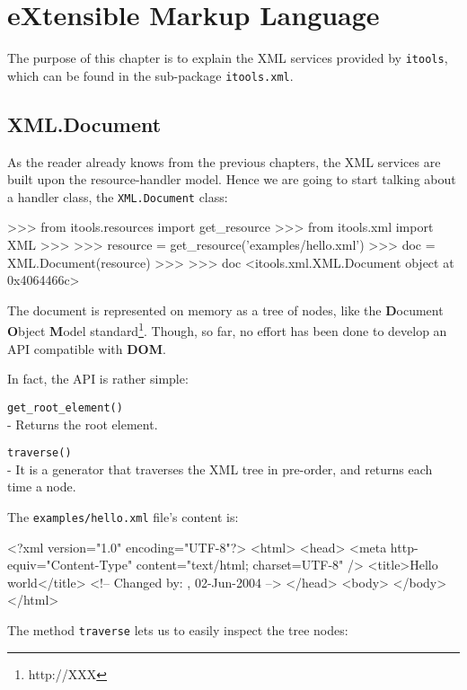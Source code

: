 \chapter{eXtensible Markup Language}

The purpose of this chapter is to explain the XML services provided by
{\tt itools}, which can be found in the sub-package {\tt itools.xml}.

\section{XML.Document}

As the reader already knows from the previous chapters, the XML services
are built upon the resource-handler model. Hence we are going to start
talking about a handler class, the {\tt XML.Document} class:

\begin{code}
    >>> from itools.resources import get_resource
    >>> from itools.xml import XML
    >>>
    >>> resource = get_resource('examples/hello.xml')
    >>> doc = XML.Document(resource)
    >>>
    >>> doc
    <itools.xml.XML.Document object at 0x4064466c>
\end{code}

The document is represented on memory as a tree of nodes, like the
{\bf D}ocument {\bf O}bject {\bf M}odel standard\footnote{http://XXX}.
Though, so far, no effort has been done to develop an API compatible with
{\bf DOM}.

In fact, the API is rather simple:

\begin{api}
    {\tt get\_root\_element()}\\
    - Returns the root element.

    {\tt traverse()}\\
    - It is a generator that traverses the XML tree in pre-order, and returns
    each time a node.
\end{api}

The {\tt examples/hello.xml} file's content is:

\begin{code}
    <?xml version="1.0" encoding="UTF-8"?>
    <html>
      <head>
        <meta http-equiv="Content-Type" content="text/html; charset=UTF-8" />
        <title>Hello world</title>
        <!-- Changed by: , 02-Jun-2004 -->
      </head>
      <body>
      </body>
    </html>
\end{code}

The method {\tt traverse} lets us to easily inspect the tree nodes:


